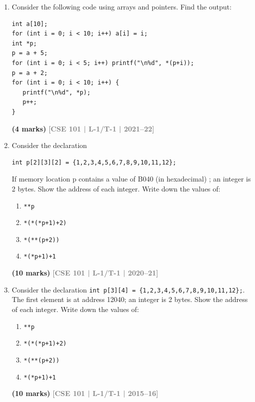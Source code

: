 \documentclass[12pt,a3paper]{article}
\newcommand{\yr}[1]{\hfill\textcolor{gray}{\small\textbf{[#1]}}}
\newcommand{\mk}[1]{\textcolor{orange!70!black}{\small\textbf{(#1 marks)}}}
\begin{document}
\begin{enumerate}
\item Consider the following code using arrays and pointers. Find the output:
 
\begin{lstlisting}
int a[10];
for (int i = 0; i < 10; i++) a[i] = i;
int *p;
p = a + 5;
for (int i = 0; i < 5; i++) printf("\n%d", *(p+i));
p = a + 2;
for (int i = 0; i < 10; i++) {
   printf("\n%d", *p); 
   p++; 
}
\end{lstlisting}
\mk{4} \yr{CSE 101 | L-1/T-1 | 2021--22}

\item Consider the declaration 
\begin{lstlisting}
int p[2][3][2] = {1,2,3,4,5,6,7,8,9,10,11,12};
\end{lstlisting}

If memory location p contains a value of B040 (in hexadecimal) ; an integer is 2 bytes. Show the address of each integer. Write down the values of:
\begin{enumerate}
  \item \texttt{**p}
  \item \texttt{*(*(*p+1)+2)}
  \item \texttt{*(**(p+2))}
  \item \texttt{*(*p+1)+1}
\end{enumerate}
 
\mk{10} \yr{CSE 101 | L-1/T-1 | 2020--21}

\item Consider the declaration \texttt{int p[3][4] = \{1,2,3,4,5,6,7,8,9,10,11,12\};}. The first element is at address 12040; an integer is 2 bytes. Show the address of each integer. Write down the values of:
\begin{enumerate}
  \item \texttt{**p}
  \item \texttt{*(*(*p+1)+2)}
  \item \texttt{*(**(p+2))}
  \item \texttt{*(*p+1)+1}
\end{enumerate}
 
\mk{10} \yr{CSE 101 | L-1/T-1 | 2015--16}



\end{enumerate}
\end{document}
